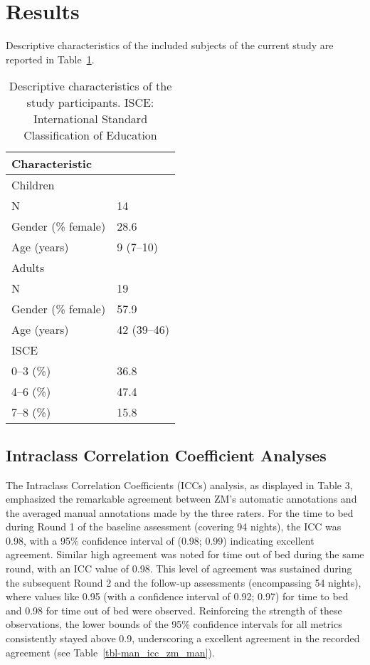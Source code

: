 \documentclass[
  10pt,
]{scrbook}
\begin{document}
\hypertarget{results}{%
\section{Results}\label{results}}

Descriptive characteristics of the included subjects of the current
study are reported in Table~\ref{tbl-man_describe}.

\begingroup

\footnotesize

\hypertarget{tbl-man_describe}{}
\begin{longtable}{ll}
\caption{\label{tbl-man_describe}Descriptive characteristics of the study participants. ISCE:
International Standard Classification of Education }\tabularnewline

\toprule
Characteristic &  \\ 
\midrule
\multicolumn{2}{l}{Children} \\ 
\midrule
N & 14 \\ 
Gender (\% female) & 28.6 \\ 
Age (years) & 9 (7–10) \\ 
\midrule
\multicolumn{2}{l}{Adults} \\ 
\midrule
N & 19 \\ 
Gender (\% female) & 57.9 \\ 
Age (years) & 42 (39–46) \\ 
ISCE &  \\ 
0–3 (\%) & 36.8 \\ 
4–6 (\%) & 47.4 \\ 
7–8 (\%) & 15.8 \\ 
\bottomrule
\end{longtable}

\endgroup

\hypertarget{intraclass-correlation-coefficient-analyses}{%
\subsection{Intraclass Correlation Coefficient
Analyses}\label{intraclass-correlation-coefficient-analyses}}

The Intraclass Correlation Coefficients (ICCs) analysis, as displayed in
Table 3, emphasized the remarkable agreement between ZM's automatic
annotations and the averaged manual annotations made by the three
raters. For the time to bed during Round 1 of the baseline assessment
(covering 94 nights), the ICC was 0.98, with a 95\% confidence interval
of (0.98; 0.99) indicating excellent agreement. Similar high agreement
was noted for time out of bed during the same round, with an ICC value
of 0.98. This level of agreement was sustained during the subsequent
Round 2 and the follow-up assessments (encompassing 54 nights), where
values like 0.95 (with a confidence interval of 0.92; 0.97) for time to
bed and 0.98 for time out of bed were observed. Reinforcing the strength
of these observations, the lower bounds of the 95\% confidence intervals
for all metrics consistently stayed above 0.9, underscoring a excellent
agreement in the recorded agreement (see
Table~\ref{tbl-man_icc_zm_man}).
\end{document}
